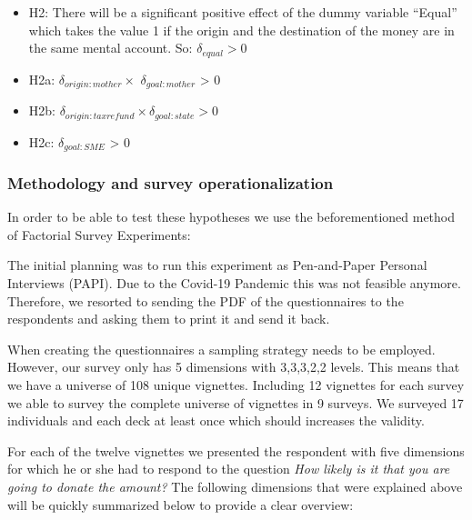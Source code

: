 \documentclass[
  12pt,
]{article}
\begin{document}
\begin{itemize}
\item
  H2: There will be a significant positive effect of the dummy variable
  ``Equal'' which takes the value 1 if the origin and the destination of
  the money are in the same mental account. So: \(\delta_{equal} > 0\)
\item
  H2a: \(\delta_{origin:mother} \times\) \(\delta_{goal:mother}\)
  \textgreater{} 0
\item
  H2b: \(\delta_{origin:taxrefund} \times \delta_{goal:state} > 0\)
\item
  H2c: \(\delta_{goal:SME}\) \textgreater{} 0
\end{itemize}

\hypertarget{methodology-and-survey-operationalization}{%
\subsubsection{Methodology and survey
operationalization}\label{methodology-and-survey-operationalization}}

In order to be able to test these hypotheses we use the beforementioned
method of Factorial Survey Experiments:

The initial planning was to run this experiment as Pen-and-Paper
Personal Interviews (PAPI). Due to the Covid-19 Pandemic this was not
feasible anymore. Therefore, we resorted to sending the PDF of the
questionnaires to the respondents and asking them to print it and send
it back.

When creating the questionnaires a sampling strategy needs to be
employed. However, our survey only has 5 dimensions with 3,3,3,2,2
levels. This means that we have a universe of 108 unique vignettes.
Including 12 vignettes for each survey we able to survey the complete
universe of vignettes in 9 surveys. We surveyed 17 individuals and each
deck at least once which should increases the validity.

For each of the twelve vignettes we presented the respondent with five
dimensions for which he or she had to respond to the question \emph{How
likely is it that you are going to donate the amount?} The following
dimensions that were explained above will be quickly summarized below to
provide a clear overview:
\end{document}
